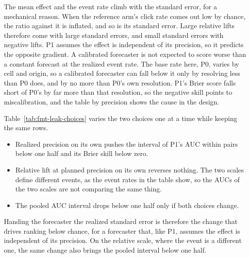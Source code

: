 \begin{table}[t]\centering\scriptsize
\caption{The cautionary run on the headline archive: relative lift at realized precision, for the two extreme deciles of the realized standard error $s$. The columns give the mean effect in percent, the significant-positive rate in percent, P1's mean $\psig$ in percent, and P1's coverage of the 90 percent interval. The last row reports P1's Brier skill against the base rate across all deciles.}
\label{tab:fmt-cautionary}

\end{table}

The mean effect and the event rate climb with the standard error, for a mechanical reason. When the reference arm's click rate comes out low by chance, the ratio against it is inflated, and so is its standard error. Large relative lifts therefore come with large standard errors, and small standard errors with negative lifts. P1 assumes the effect is independent of its precision, so it predicts the opposite gradient. A calibrated forecaster is not expected to score worse than a constant forecast at the realized event rate. The base rate here, P0, varies by cell and origin, so a calibrated forecaster can fall below it only by resolving less than P0 does, and by no more than P0's own resolution. P1's Brier score falls short of P0's by far more than that resolution, so the negative skill points to miscalibration, and the table by precision shows the cause in the design.

Table~\ref{tab:fmt-leak-choices} varies the two choices one at a time while keeping the same rows.
\begin{itemize}
\item Realized precision on its own pushes the interval of P1's AUC within pairs below one half and its Brier skill below zero.
\item Relative lift at planned precision on its own reverses nothing. The two scales define different events, as the event rates in the table show, so the AUCs of the two scales are not comparing the same thing.
\item The pooled AUC interval drops below one half only if both choices change.
\end{itemize}
Handing the forecaster the realized standard error is therefore the change that drives ranking below chance, for a forecaster that, like P1, assumes the effect is independent of its precision. On the relative scale, where the event is a different one, the same change also brings the pooled interval below one half.

